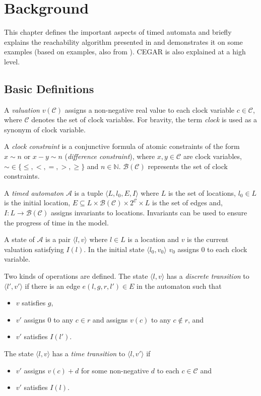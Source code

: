 \chapter{Background}
\label{chap:background}

This chapter defines the important aspects of timed automata and briefly
explains the reachability algorithm presented in
\cite{bengtsson2004timed} and demonstrates it on some examples (based on examples, also from \cite{bengtsson2004timed}).
CEGAR is also explained at a high level.


\section{Basic Definitions}
A \emph{valuation} $v(\mathcal{C})$ assigns a non-negative real value
to each clock variable $c \in \mathcal{C}$, where $\mathcal{C}$ denotes the set of clock
variables. For bravity, the term \emph{clock} is used as a synonym of {clock variable}.

A \emph{clock constraint} is a conjunctive formula of atomic
constraints of the form $x \sim n$ or $x - y \sim n$ (\emph{difference
	constraint}), where $x,y \in \mathcal{C}$ are clock variables, $\sim \in
\{\leq,<,=,>,\geq\}$ and \hbox{$n \in \mathbb{N}$}. $\mathcal{B}(\mathcal{C})$ represents the set of clock
constraints.

A \emph{timed automaton} $\mathcal{A}$ is a tuple $\langle L, l_0,
E, I\rangle$ where
$L$ is the set of locations,
$l_0 \in L$ is the initial location,
$E \subseteq L \times \mathcal{B}(\mathcal{C}) \times 2^\mathcal{C} \times L$
is the set of edges and,
$I: L \to \mathcal{B}(\mathcal{C})$ assigns invariants to locations.  Invariants can be used to ensure the progress of time in the model.


A state of $\mathcal{A}$ is a pair $\langle l,v \rangle$ where $l \in L$ is a
location and $v$ is the current valuation satisfying $I(l)$. In the initial
state $\langle l_0,v_0 \rangle$ $v_0$ assigns 0 to each clock variable.

Two kinds of operations are defined. The state $\langle l,v \rangle$ has a
\emph{discrete transition} to $\langle l',v' \rangle$  if there is an
edge $e(l,g,r,l') \in E$ in the automaton such that 
\begin{itemize}
	\item $v$ satisfies $g$, 
	\item $v'$ assigns 0 to any $c \in r$ and assigns $v(c)$ to any $c \not\in r$, and
	\item $v'$ satisfies $I(l')$. 
\end{itemize}
The state $\langle l,v \rangle$ has a \emph{time transition} to $\langle l,v' \rangle$ if
\begin{itemize}
	\item $v'$ assigns $v(c)+d$ for some non-negative $d$ to each $c \in \mathcal{C}$ and
	\item $v'$ satisfies $I(l)$. 
\end{itemize}




